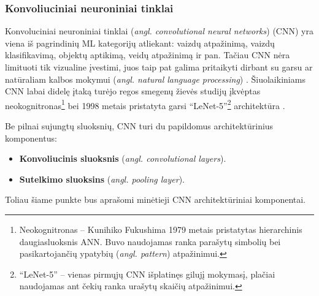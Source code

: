 \documentclass{VUMIFPSbakalaurinis}
\begin{document}
\subsubsection{Konvoliuciniai neuroniniai tinklai}\label{subsubsec:cnn}
{
	Konvoluciniai neuroniniai tinklai (\textit{angl. convolutional neural networks}) (CNN) yra viena iš pagrindinių ML kategorijų atliekant: vaizdų atpažinimą, vaizdų klasifikavimą, objektų aptikimą, veidų atpažinimą ir pan. Tačiau CNN nėra limituoti tik vizualine įvestimi, juos taip pat galima pritaikyti dirbant su garsu ar natūraliam kalbos mokymui (\textit{angl. natural language processing}) \cite{cnn_online, handson}. Šiuolaikiniams CNN labai didelę įtaką turėjo regos smegenų žievės studijų įkvėptas neokognitronas\footnote{Neokognitronas -- Kunihiko Fukushima 1979 metais pristatytas hierarchinis daugiasluoksnis ANN. Buvo naudojamas ranka parašytų simbolių bei pasikartojančių ypatybių (\textit{angl. pattern}) atpažinimui.} \cite{fukushima1980neocognitron} bei 1998 metais pristatyta garsi \enquote{LeNet-5}\footnote{\enquote{LeNet-5} -- vienas pirmųjų CNN išplatinęs gilujį mokymasį, plačiai naudojamas ant čekių ranka urašytų skaičių atpažinimui.} architektūra \cite{lecun1998gradient}. \par
		
	Be pilnai sujungtų sluoksnių, CNN turi du papildomus architektūrinius komponentus:
	\begin{itemize}
		\item \textbf{Konvoliucinis sluoksnis} (\textit{angl. convolutional layers}).
		\item \textbf{Sutelkimo sluoksins} (\textit{angl. pooling layer}).
	\end{itemize}\par
	Toliau šiame punkte bus aprašomi minėtieji CNN architektūriniai komponentai.
}	
\label{subsubsubsec:convolution_layer}
\end{document}
